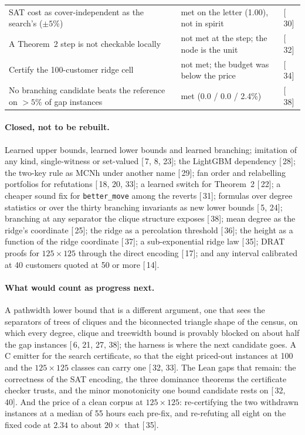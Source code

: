 \documentclass[11pt,a4paper]{article}
\renewcommand{\S}[1]{[\textsection\,#1]}
\newcommand{\code}[1]{\texttt{#1}}
\begin{document}
\begin{table}[p]
\begin{tabular}{>{\raggedright\arraybackslash}p{}>{\raggedright\arraybackslash}p{}l}
SAT cost as cover-independent as the search's ($\pm 5\%$) & met on the letter (1.00), not in spirit & \S{30} \\
A Theorem~2 step is not checkable locally & not met at the step; the node is the unit & \S{32} \\
Certify the 100-customer ridge cell & not met; the budget was below the price & \S{34} \\
No branching candidate beats the reference on $> 5\%$ of gap instances & met (0.0 / 0.0 / 2.4\%) & \S{38} \\
\bottomrule
\end{tabular}
\end{table}

\paragraph{Closed, not to be rebuilt.}
Learned upper bounds, learned lower bounds and learned branching; imitation of
any kind, single-witness or set-valued \S{7, 8, 23}; the LightGBM dependency
\S{28}; the two-key rule as MCNh under another name \S{29}; fan order and
relabelling portfolios for refutations \S{18, 20, 33}; a learned switch for
Theorem~2 \S{22}; a cheaper sound fix for \code{better\_move} among the
reverts \S{31}; formulas over degree statistics or over the thirty branching
invariants as new lower bounds \S{5, 24}; branching at any separator the
clique structure exposes \S{38}; mean degree as the ridge's coordinate
\S{25}; the ridge as a percolation threshold \S{36}; the height as a function
of the ridge coordinate \S{37}; a sub-exponential ridge law \S{35}; DRAT
proofs for $125 \times 125$ through the direct encoding \S{17}; and any
interval calibrated at 40 customers quoted at 50 or more \S{14}.

\paragraph{What would count as progress next.}
A pathwidth lower bound that is a different argument, one that sees the
separators of trees of cliques and the biconnected triangle shape of the
census, on which every degree, clique and treewidth bound is provably blocked
on about half the gap instances \S{6, 21, 27, 38}; the harness is where the
next candidate goes. A C emitter for the search certificate, so that the
eight priced-out instances at 100 and the $125 \times 125$ classes can carry
one \S{32, 33}. The Lean gaps that remain: the correctness of the SAT
encoding, the three dominance theorems the certificate checker trusts, and the
minor monotonicity one bound candidate rests on \S{32, 40}. And the price of
a clean corpus at $125 \times 125$: re-certifying the two withdrawn
instances at a median of 55 hours each pre-fix, and re-refuting all eight on
the fixed code at $2.34$ to about $20\times$ that \S{35}.
\end{document}
